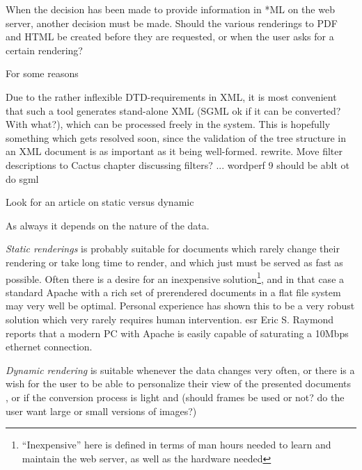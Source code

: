 When the decision has been made to provide information in *ML on the
web server, another decision must be made.  Should the various
renderings to PDF and HTML be created before they are requested, or
when the user asks for a certain rendering?


      
For some reasons


\textsf{
Due to the rather inflexible DTD-requirements in XML, it is most
convenient that such a tool generates stand-alone XML (\textsf{SGML ok
  if it can be converted?  With what?}), which can be processed freely
in the system.  This is hopefully something which gets resolved soon,
since the validation of the tree structure in an XML document is as
important as it being well-formed. \textsf{rewrite.}
}
\textsf{Move filter descriptions to Cactus chapter discussing
  filters?  ... wordperf 9 should be ablt ot do sgml} 

\textsf{Look for an article on static versus dynamic}

As always it depends on the nature of the data.

\textit{Static renderings} is probably suitable for documents which
rarely change their rendering or take long time to render, and which
just must be served as fast as possible.  Often there is a desire for
an inexpensive solution\footnote{``Inexpensive'' here is defined in
  terms of man hours needed to learn and maintain the web server, as
  well as the hardware needed}, and in that case a standard Apache
with a rich set of prerendered documents in a flat file system may
very well be optimal.  Personal experience has shown this to be a very
robust solution which very rarely requires human intervention.
\textsf{\textsf{esr} Eric S. Raymond reports that a modern PC with Apache is
easily capable of saturating a 10Mbps ethernet connection.
}

\textsf{
\textit{Dynamic rendering} is suitable whenever the data changes very
often, or there is a wish for the user to be able to personalize their
view of the presented documents , or if the conversion
process is light and
(should frames be used or not?  do the
user want large or small versions of images?)
}




